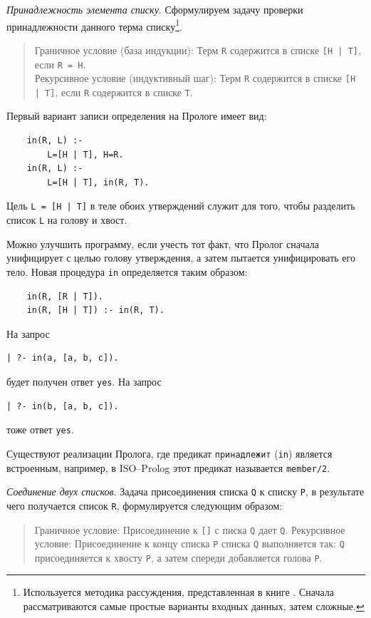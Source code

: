 \documentclass[12pt, openany, twoside]{book} %
\begin{document}
\emph{Принадлежность элемента списку}. Сформулируем задачу проверки принадлежности данного терма списку\footnote{Используется методика рассуждения, представленная в книге \cite{Bratko}. Сначала рассматриваются самые простые варианты входных данных, затем сложные.}.

\begin{quote}
\noindent Граничное условие (база индукции): Терм {\tt R} содержится в списке {\tt [H | T]}, если {\tt R = H}.\\
Рекурсивное условие (индуктивный шаг): Терм {\tt R} содержится в списке {\tt [H | T]}, если {\tt R}
содержится в списке {\tt Т}.
\end{quote}

\noindent Первый вариант записи определения на Прологе имеет вид:
{\tt\begin{verbatim}
    in(R, L) :-
        L=[H | T], H=R.
    in(R, L) :-
        L=[H | T], in(R, T).
\end{verbatim}}

\noindent Цель {\tt L = [H | T]} в теле обоих утверждений служит для того, чтобы разделить список {\tt L} на голову и хвост.

Можно улучшить программу, если учесть тот факт, что Пролог сначала унифицирует с целью голову утверждения, а затем пытается унифицировать его тело. Новая процедура {\tt in} определяется таким образом:
{\tt\begin{verbatim}
    in(R, [R | Т]).
    in(R, [H | Т]) :- in(R, T).
\end{verbatim}}

\noindent На запрос
{\tt\begin{verbatim}
| ?- in(а, [а, b, с]).
\end{verbatim}}
\noindent будет получен ответ {\tt yes}.
\noindent На запрос
{\tt\begin{verbatim}
| ?- in(b, [a, b, с]).
\end{verbatim}}
\noindent тоже ответ {\tt yes}.

Существуют реализации Пролога, где предикат {\tt принадлежит} ({\tt in}) является встроенным, например, в ISO--Prolog этот предикат называется \texttt{member/2}.

\emph{Соединение двух списков}. Задача присоединения списка {\tt Q} к списку {\tt Р}, в результате чего получается список {\tt R}, формулируется следующим образом:
\begin{quote}
\noindent Граничное условие: Присоединение к {\tt []} с писка {\tt Q} дает {\tt Q}.
\noindent Рекурсивное условие: Присоединение к концу списка {\tt Р} списка {\tt Q} выполняется так: {\tt Q} присоединяется к хвосту {\tt Р}, а затем спереди добавляется голова {\tt Р}.
\end{quote}
\end{document}
